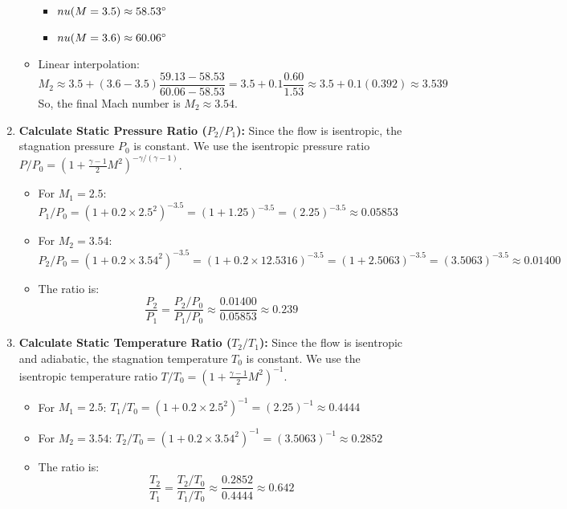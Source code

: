 \begin{enumerate}
\begin{itemize}
    \begin{itemize}
    \tightlist
    \item
      \(\\nu(M=3.5) \approx 58.53^\circ\)
    \item
      \(\\nu(M=3.6) \approx 60.06^\circ\)
    \end{itemize}
  \item
    Linear interpolation:
    \[ M_2 \approx 3.5 + (3.6 - 3.5) \frac{59.13 - 58.53}{60.06 - 58.53} = 3.5 + 0.1 \frac{0.60}{1.53} \approx 3.5 + 0.1(0.392) \approx 3.539 \]
    So, the final Mach number is \(M_2 \approx \mathbf{3.54}\).
  \end{itemize}
\item
  \textbf{Calculate Static Pressure Ratio (\(P_2/P_1\)):} Since the flow
  is isentropic, the stagnation pressure \(P_0\) is constant. We use the
  isentropic pressure ratio
  \(P/P_0 = (1 + \frac{\gamma-1}{2} M^2)^{-\gamma/(\gamma-1)}\).

  \begin{itemize}
  \tightlist
  \item
    For \(M_1 = 2.5\):
    \(P_1/P_0 = (1 + 0.2 \times 2.5^2)^{-3.5} = (1 + 1.25)^{-3.5} = (2.25)^{-3.5} \approx 0.05853\)
  \item
    For \(M_2 = 3.54\):
    \(P_2/P_0 = (1 + 0.2 \times 3.54^2)^{-3.5} = (1 + 0.2 \times 12.5316)^{-3.5} = (1 + 2.5063)^{-3.5} = (3.5063)^{-3.5} \approx 0.01400\)
  \item
    The ratio is:
    \[ \frac{P_2}{P_1} = \frac{P_2/P_0}{P_1/P_0} \approx \frac{0.01400}{0.05853} \approx \mathbf{0.239} \]
  \end{itemize}
\item
  \textbf{Calculate Static Temperature Ratio (\(T_2/T_1\)):} Since the
  flow is isentropic and adiabatic, the stagnation temperature \(T_0\)
  is constant. We use the isentropic temperature ratio
  \(T/T_0 = (1 + \frac{\gamma-1}{2} M^2)^{-1}\).

  \begin{itemize}
  \tightlist
  \item
    For \(M_1 = 2.5\):
    \(T_1/T_0 = (1 + 0.2 \times 2.5^2)^{-1} = (2.25)^{-1} \approx 0.4444\)
  \item
    For \(M_2 = 3.54\):
    \(T_2/T_0 = (1 + 0.2 \times 3.54^2)^{-1} = (3.5063)^{-1} \approx 0.2852\)
  \item
    The ratio is:
    \[ \frac{T_2}{T_1} = \frac{T_2/T_0}{T_1/T_0} \approx \frac{0.2852}{0.4444} \approx \mathbf{0.642} \]
  \end{itemize}
\end{enumerate}

